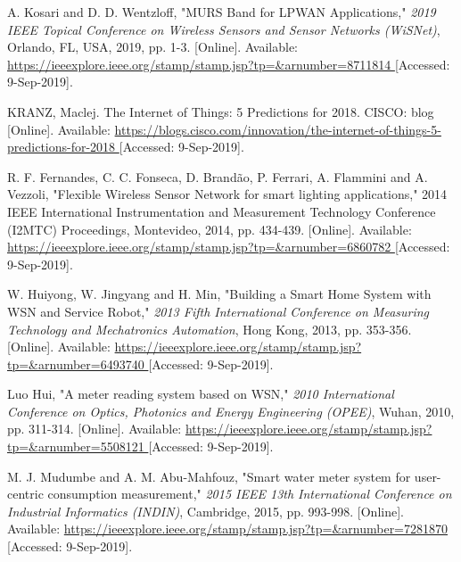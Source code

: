 \begin{thebibliography}{9}
A. Kosari and D. D. Wentzloff, "MURS Band for LPWAN Applications," \textit{2019 IEEE Topical Conference on Wireless Sensors and Sensor Networks (WiSNet)}, Orlando, FL, USA, 2019, pp. 1-3.
[Online]. Available:
\url{
https://ieeexplore.ieee.org/stamp/stamp.jsp?tp=&arnumber=8711814
}
[Accessed: 9-Sep-2019].


KRANZ, Maclej. The Internet of Things: 5 Predictions for 2018. CISCO: blog 
[Online]. Available:
\url{
https://blogs.cisco.com/innovation/the-internet-of-things-5-predictions-for-2018
}
[Accessed: 9-Sep-2019].

R. F. Fernandes, C. C. Fonseca, D. Brandão, P. Ferrari, A. Flammini and A. Vezzoli, "Flexible Wireless Sensor Network for smart lighting applications," 2014 IEEE International Instrumentation and Measurement Technology Conference (I2MTC) Proceedings, Montevideo, 2014, pp. 434-439.
[Online]. Available:
\url{
https://ieeexplore.ieee.org/stamp/stamp.jsp?tp=&arnumber=6860782
}
[Accessed: 9-Sep-2019].



W. Huiyong, W. Jingyang and H. Min, "Building a Smart Home System with WSN and Service Robot," \textit{2013 Fifth International Conference on Measuring Technology and Mechatronics Automation}, Hong Kong, 2013, pp. 353-356.
[Online]. Available:
\url{
https://ieeexplore.ieee.org/stamp/stamp.jsp?tp=&arnumber=6493740
}
[Accessed: 9-Sep-2019].


Luo Hui, "A meter reading system based on WSN," \textit{2010 International Conference on Optics, Photonics and Energy Engineering (OPEE)}, Wuhan, 2010, pp. 311-314.
[Online]. Available:
\url{
https://ieeexplore.ieee.org/stamp/stamp.jsp?tp=&arnumber=5508121
}
[Accessed: 9-Sep-2019].


M. J. Mudumbe and A. M. Abu-Mahfouz, "Smart water meter system for user-centric consumption measurement," \textit{2015 IEEE 13th International Conference on Industrial Informatics (INDIN)}, Cambridge, 2015, pp. 993-998.
[Online]. Available:
\url{
https://ieeexplore.ieee.org/stamp/stamp.jsp?tp=&arnumber=7281870
}
[Accessed: 9-Sep-2019].



\end{thebibliography}
